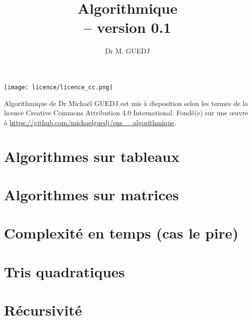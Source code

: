 \documentclass[11pt]{article} %
\title{Algorithmique\\ -- version 0.1}
\date{\vspace{-5ex}}
\author{Dr M. GUEDJ}
\begin{document}
\renewcommand{\contentsname}{Table des Matières}
\maketitle


\newpage
\begin{center}
\texttt{[image: licence/licence\_cc.png]}

\begin{small}
Algorithmique de Dr Michaël GUEDJ est mis à disposition selon les termes de la licence Creative Commons Attribution 4.0 International.
Fondé(e) sur une œuvre à 
\url{https://github.com/michaelguedj/ens__algorithmique}.
\end{small}
\end{center}
\newpage


\tableofcontents

\newpage
\section{Algorithmes sur tableaux}


%

\newpage
\section{Algorithmes sur matrices}


\newpage
\section{Complexité en temps (cas le pire)}


\newpage
\section{Tris quadratiques }


\newpage
\section{Récursivité}

\end{document}
